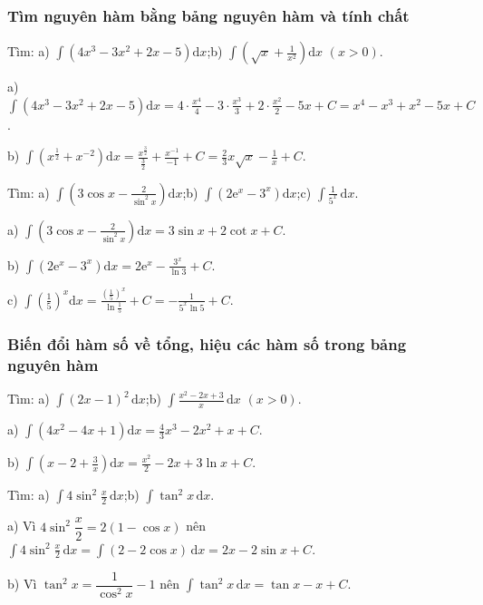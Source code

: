 \subsubsection{Tìm nguyên hàm bằng bảng nguyên hàm và tính chất}
\begin{vidu}
Tìm: a) $\displaystyle\int\left(4x^3-3x^2+2x-5\right)\mathrm dx$;\qquad b) $\displaystyle\int\left(\sqrt x+\frac1{x^2}\right)\mathrm dx$ $(x>0)$.
\begin{loigiai}
a) $\displaystyle\int\left(4x^3-3x^2+2x-5\right)\mathrm dx=4\cdot\frac{x^4}4-3\cdot\frac{x^3}3+2\cdot\frac{x^2}2-5x+C=x^4-x^3+x^2-5x+C$.

b) $\displaystyle\int\left(x^{\frac12}+x^{-2}\right)\mathrm dx=\frac{x^{\frac32}}{\frac32}+\frac{x^{-1}}{-1}+C=\frac23x\sqrt x-\frac1x+C$.
\end{loigiai}
\end{vidu}

\begin{vidu}
Tìm: a) $\displaystyle\int\left(3\cos x-\frac{2}{\sin^2x}\right)\mathrm dx$;\qquad b) $\displaystyle\int\left(2\mathrm e^x-3^x\right)\mathrm dx$;\qquad c) $\displaystyle\int\frac{1}{5^x}\,\mathrm dx$.
\begin{loigiai}
a) $\displaystyle\int\left(3\cos x-\frac{2}{\sin^2x}\right)\mathrm dx=3\sin x+2\cot x+C$.

b) $\displaystyle\int\left(2\mathrm e^x-3^x\right)\mathrm dx=2\mathrm e^x-\frac{3^x}{\ln3}+C$.

c) $\displaystyle\int\left(\frac15\right)^x\mathrm dx=\frac{\left(\frac15\right)^x}{\ln\frac15}+C=-\frac{1}{5^x\ln5}+C$.
\end{loigiai}
\end{vidu}

\subsubsection{Biến đổi hàm số về tổng, hiệu các hàm số trong bảng nguyên hàm}
\begin{vidu}
Tìm: a) $\displaystyle\int(2x-1)^2\,\mathrm dx$;\qquad b) $\displaystyle\int\frac{x^2-2x+3}{x}\,\mathrm dx$ $(x>0)$.
\begin{loigiai}
a) $\displaystyle\int\left(4x^2-4x+1\right)\mathrm dx=\frac43x^3-2x^2+x+C$.

b) $\displaystyle\int\left(x-2+\frac3x\right)\mathrm dx=\frac{x^2}2-2x+3\ln x+C$.
\end{loigiai}
\end{vidu}

\begin{vidu}
Tìm: a) $\displaystyle\int4\sin^2\frac x2\,\mathrm dx$;\qquad b) $\displaystyle\int\tan^2x\,\mathrm dx$.
\begin{loigiai}
a) Vì $4\sin^2\dfrac x2=2(1-\cos x)$ nên $\displaystyle\int4\sin^2\frac x2\,\mathrm dx=\int(2-2\cos x)\,\mathrm dx=2x-2\sin x+C$.

b) Vì $\tan^2x=\dfrac1{\cos^2x}-1$ nên $\displaystyle\int\tan^2x\,\mathrm dx=\tan x-x+C$.
\end{loigiai}
\end{vidu}

